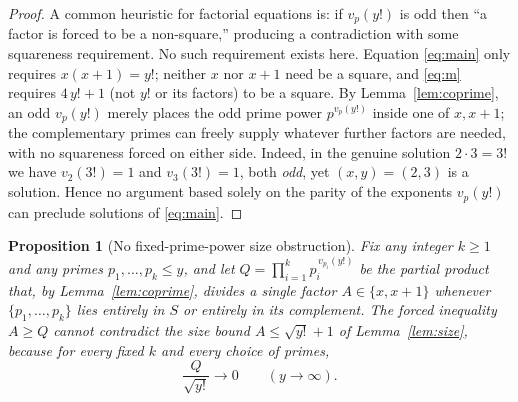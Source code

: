 \documentclass{amsart}
\theoremstyle{plain}
\newtheorem{proposition}{Proposition}
\theoremstyle{remark}
\begin{document}
\begin{proof}
A common heuristic for factorial equations is: if $v_p(y!)$ is odd then ``a
factor is forced to be a non-square,'' producing a contradiction with some
squareness requirement. No such requirement exists here. Equation
\eqref{eq:main} only requires $x(x+1)=y!$; neither $x$ nor $x+1$ need be a
square, and \eqref{eq:m} requires $4\,y!+1$ (not $y!$ or its factors) to be
a square. By Lemma~\ref{lem:coprime}, an odd $v_p(y!)$ merely places the odd
prime power $p^{v_p(y!)}$ inside one of $x,x+1$; the complementary primes can
freely supply whatever further factors are needed, with no squareness forced
on either side. Indeed, in the genuine solution $2\cdot3=3!$ we have
$v_2(3!)=1$ and $v_3(3!)=1$, both \emph{odd}, yet $(x,y)=(2,3)$ is a
solution. Hence no argument based solely on the parity of the exponents
$v_p(y!)$ can preclude solutions of \eqref{eq:main}.
\end{proof}

\begin{proposition}[No fixed-prime-power size obstruction]\label{prop:nosize}
Fix any integer $k\ge1$ and any primes $p_1,\dots,p_k\le y$, and let
$Q=\prod_{i=1}^{k}p_i^{\,v_{p_i}(y!)}$ be the partial product that, by
Lemma~\ref{lem:coprime}, divides a single factor $A\in\{x,x+1\}$ whenever
$\{p_1,\dots,p_k\}$ lies entirely in $S$ or entirely in its complement.
The forced inequality $A\ge Q$ cannot contradict the size bound
$A\le\sqrt{y!}+1$ of Lemma~\ref{lem:size}, because for every fixed $k$ and
every choice of primes,
\[
   \frac{Q}{\sqrt{y!}}\longrightarrow 0\qquad(y\to\infty).
\]
\end{proposition}
\end{document}
